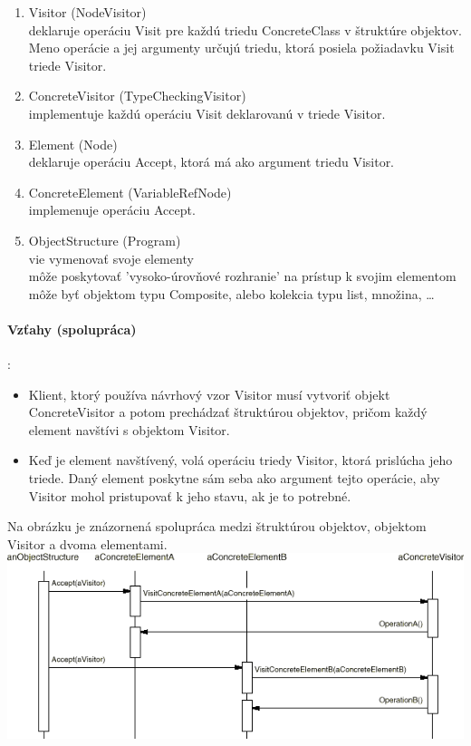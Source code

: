 			\begin{enumerate}
				\item Visitor (NodeVisitor)\\
					deklaruje operáciu Visit pre každú triedu ConcreteClass v štruktúre objektov. Meno operácie a jej argumenty určujú triedu, ktorá posiela požiadavku Visit triede Visitor.
				\item ConcreteVisitor (TypeCheckingVisitor)\\
					implementuje každú operáciu Visit deklarovanú v triede Visitor.
				\item Element (Node)\\
					deklaruje operáciu Accept, ktorá má ako argument triedu Visitor.
				\item ConcreteElement (VariableRefNode)\\
					implemenuje operáciu Accept.
				\item ObjectStructure (Program)\\
					vie vymenovať svoje elementy\\
					môže poskytovať 'vysoko-úrovňové rozhranie' na prístup k svojim elementom\\
					môže byť objektom typu Composite, alebo kolekcia typu list, množina, …
			\end{enumerate}

		\paragraph{Vzťahy (spolupráca)}:\\
			\begin{itemize}
				\item Klient, ktorý používa návrhový vzor Visitor musí vytvoriť objekt ConcreteVisitor a potom prechádzať štruktúrou objektov, pričom každý element navštívi s objektom Visitor.
				\item Keď je element navštívený, volá operáciu triedy Visitor, ktorá prislúcha jeho triede. Daný element poskytne sám seba ako argument tejto operácie, aby Visitor mohol pristupovať k jeho stavu, ak je to potrebné.
			\end{itemize}
			Na obrázku je znázornená spolupráca medzi štruktúrou objektov, objektom Visitor a dvoma elementami.\\


			\includegraphics[width=.9\textwidth]{images/programovanie/visitor4}

